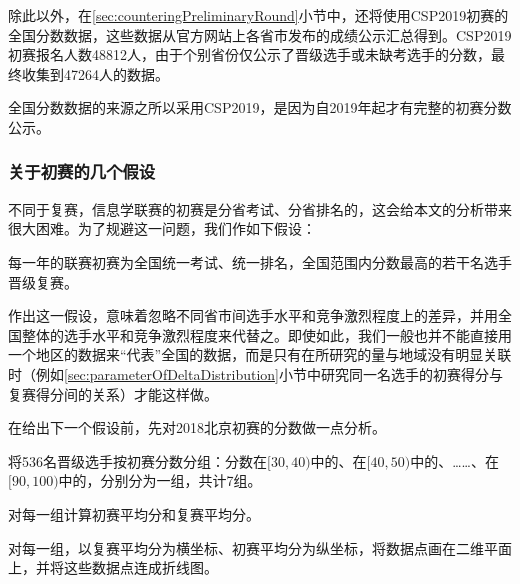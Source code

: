             除此以外，在\ref{sec:counteringPreliminaryRound}小节中，还将使用CSP2019初赛的全国分数数据，这些数据从官方网站上各省市发布的成绩公示汇总得到。CSP2019初赛报名人数48812人，由于个别省份仅公示了晋级选手或未缺考选手的分数，最终收集到47264人的数据。

            全国分数数据的来源之所以采用CSP2019，是因为自2019年起才有完整的初赛分数公示。

        \subsubsection{关于初赛的几个假设}\label{sec:assumptionsOnPreliminaryRound}

            不同于复赛，信息学联赛的初赛是分省考试、分省排名的，这会给本文的分析带来很大困难。为了规避这一问题，我们作如下假设：

            \begin{assumption}
                每一年的联赛初赛为全国统一考试、统一排名，全国范围内分数最高的若干名选手晋级复赛。

                \label{ass:preliminaryRoundsOfAllProvincesUnite}
            \end{assumption}

            作出这一假设，意味着忽略不同省市间选手水平和竞争激烈程度上的差异，并用全国整体的选手水平和竞争激烈程度来代替之。即使如此，我们一般也并不能直接用一个地区的数据来“代表”全国的数据，而是只有在所研究的量与地域没有明显关联时（例如\ref{sec:parameterOfDeltaDistribution}小节中研究同一名选手的初赛得分与复赛得分间的关系）才能这样做。

            \vspace{1.5ex}

            在给出下一个假设前，先对2018北京初赛的分数做一点分析。

            \begin{asparaenum}[\bfseries{步骤} 1.]
                \item 将536名晋级选手按初赛分数分组：分数在$[30,40)$中的、在$[40,50)$中的、……、在$[90,100)$中的，分别分为一组，共计7组。
                \item 对每一组计算初赛平均分和复赛平均分。
                \item 对每一组，以复赛平均分为横坐标、初赛平均分为纵坐标，将数据点画在二维平面上，并将这些数据点连成折线图。
            \end{asparaenum}

